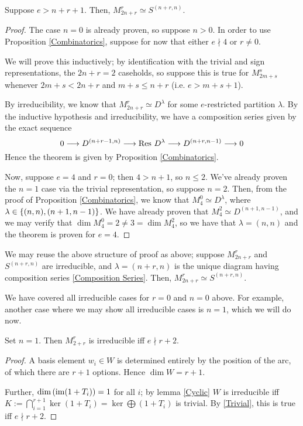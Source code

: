 \documentclass{amsart}
\begin{document}
\begin{theorem}\label{Correspondence Theorem}
  Suppose $e > n + r + 1$.
  Then, $M_{2n + r}^r \simeq S^{(n+r,n)}$.
\end{theorem}
\begin{proof}
  The case $n = 0$ is already proven, so suppose $n > 0$.
  In order to use Proposition \ref{Combinatorics}, suppose for now that either $e \nmid 4$ or $r \neq 0$.

  We will prove this inductively; by identification with the trivial and sign representations, the $2n + r = 2$ caseholds, so suppose this is true for $M_{2m + s}^s$ whenever $2m + s < 2n + r$ and $m + s \leq n + r$ (i.e. $e > m + s + 1$).

  By irreducibility, we know that $M_{2n + r}^r \simeq D^\lambda$ for some $e$-restricted partition $\lambda$.
  By the inductive hypothesis and irreducibility, we have a composition series given by the exact sequence
  \begin{equation}
    \label{Composition Series} 0 \longrightarrow D^{(n + r - 1,n)} \longrightarrow \operatorname{Res} \, D^\lambda \longrightarrow D^{(n+r,n-1)} \longrightarrow 0
   \end{equation}
  Hence the theorem is given by Proposition \ref{Combinatorics}.

  Now, suppose $e = 4$ and $r = 0$;
  then $4 > n + 1$, so $n \leq 2$.
  We've already proven the $n = 1$ case via the trivial representation, so suppose $n = 2$.
  Then, from the proof of Proposition \ref{Combinatorics}, we know that $M_{4}^0 \simeq D^\lambda$, where $\lambda \in \left\{ (n,n), (n+1,n-1) \right\}$.
  We have already proven that $M_4^2 \simeq D^{(n+1,n-1)}$, and we may verify that $\dim M_4^0 = 2 \neq 3 = \dim M_4^2$, so we have that $\lambda = (n,n)$ and the theorem is proven for $e = 4$.
\end{proof}

\iffalse
We may reuse the above structure of proof as above;
suppose $M_{2n + r}^r$ and $S^{(n+r,n)}$ are irreducible, and $\lambda = (n+r,n)$ is the unique diagram having composition series \eqref{Composition Series}.
Then, $M_{2n + r}^r \simeq S^{(n+r,n)}$.

We have covered all irreducible cases for $r = 0$ and $n = 0$ above.
For example, another case where we may show all irreducible cases is $n = 1$, which we will do now.
\begin{lemma}\label{n=1 irreducibility}
    Set $n = 1$. 
    Then $M_{2 + r}^r$ is irreducible iff $e \nmid r + 2$.
\end{lemma}
\begin{proof}
  A basis element $w_i \in W$ is determined entirely by the position of the arc, of which there are $r + 1$ options.
  Hence $\dim W = r + 1$.

  Further, $\operatorname{dim}\left( \operatorname{im} (1 + T_i) \right) = 1$ for all $i$;
  by lemma \ref{Cyclic} $W$ is irreducible iff $K := \bigcap_{i = 1}^{r+1} \ker (1 + T_i) = \ker \bigoplus (1 + T_i)$ is trivial.
  By \ref{Trivial}, this is true iff $e \nmid r + 2$.
\end{proof}
\end{document}
